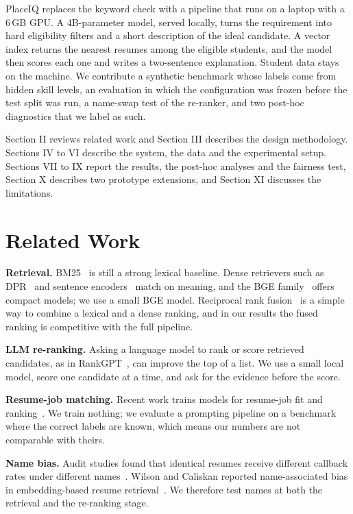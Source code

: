 \documentclass[conference]{IEEEtran}
\begin{document}
PlaceIQ replaces the keyword check with a pipeline that runs on a laptop with a 6\,GB GPU. A 4B-parameter model, served locally, turns the requirement into hard eligibility filters and a short description of the ideal candidate. A vector index returns the nearest resumes among the eligible students, and the model then scores each one and writes a two-sentence explanation. Student data stays on the machine. We contribute a synthetic benchmark whose labels come from hidden skill levels, an evaluation in which the configuration was frozen before the test split was run, a name-swap test of the re-ranker, and two post-hoc diagnostics that we label as such.

Section II reviews related work and Section III describes the design methodology. Sections IV to VI describe the system, the data and the experimental setup. Sections VII to IX report the results, the post-hoc analyses and the fairness test, Section X describes two prototype extensions, and Section XI discusses the limitations.

\section{Related Work}
\textbf{Retrieval.} BM25~\cite{robertson2009bm25} is still a strong lexical baseline. Dense retrievers such as DPR~\cite{karpukhin2020dpr} and sentence encoders~\cite{reimers2019sbert} match on meaning, and the BGE family~\cite{xiao2024cpack} offers compact models; we use a small BGE model. Reciprocal rank fusion~\cite{cormack2009rrf} is a simple way to combine a lexical and a dense ranking, and in our results the fused ranking is competitive with the full pipeline.

\textbf{LLM re-ranking.} Asking a language model to rank or score retrieved candidates, as in RankGPT~\cite{sun2023rankgpt}, can improve the top of a list. We use a small local model, score one candidate at a time, and ask for the evidence before the score.

\textbf{Resume-job matching.} Recent work trains models for resume-job fit and ranking~\cite{yu2025confitv2,jouanneau2026personjob}. We train nothing; we evaluate a prompting pipeline on a benchmark where the correct labels are known, which means our numbers are not comparable with theirs.

\textbf{Name bias.} Audit studies found that identical resumes receive different callback rates under different names~\cite{bertrand2004emily}. Wilson and Caliskan reported name-associated bias in embedding-based resume retrieval~\cite{wilson2024resume}. We therefore test names at both the retrieval and the re-ranking stage.
\end{document}

